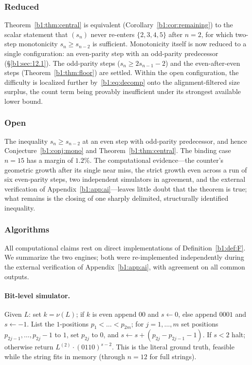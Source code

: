 \documentclass[a4paper]{article}
\theoremstyle{plain}
\theoremstyle{definition}
\theoremstyle{remark}
\begin{document}
\subsubsection*{Reduced} Theorem~\ref{b1:thm:central} is equivalent (Corollary~\ref{b1:cor:remaining}) to the scalar statement that $(s_n)$ never re-enters $\{2,3,4,5\}$ after $n=2$, for which two-step monotonicity $s_n\ge s_{n-2}$ is sufficient. Monotonicity itself is now reduced to a single configuration: an even-parity step with an odd-parity predecessor (\S\ref{b1:sec:12.1}). The odd-parity steps ($s_n\ge 2s_{n-1}-2$) and the even-after-even steps (Theorem~\ref{b1:thm:floor}) are settled. Within the open configuration, the difficulty is localized further by~\eqref{b1:eq:decomp} onto the alignment-filtered size surplus, the count term being provably insufficient under its strongest available lower bound.

\subsubsection*{Open} The inequality $s_n\ge s_{n-2}$ at an even step with odd-parity predecessor, and hence Conjecture~\ref{b1:conj:mono} and Theorem~\ref{b1:thm:central}. The binding case $n=15$ has a margin of $1.2\%$. The computational evidence---the counter's geometric growth after its single near miss, the strict growth even across a run of six even-parity steps, two independent simulators in agreement, and the external verification of Appendix~\ref{b1:app:ai}---leaves little doubt that the theorem is true; what remains is the closing of one sharply delimited, structurally identified inequality.

\subsubsection{Algorithms}\label{b1:app:alg}
All computational claims rest on direct implementations of Definition~\ref{b1:def:F}. We summarize the two engines; both were re-implemented independently during the external verification of Appendix~\ref{b1:app:ai}, with agreement on all common outputs.

\paragraph{Bit-level simulator.} Given $L$: set $k=\nu(L)$; if $k$ is even append $00$ and $s\leftarrow 0$, else append $0001$ and $s\leftarrow -1$. List the $1$-positions $p_1<\dots<p_{2m}$; for $j=1,\dots,m$ set positions $p_{2j-1},\dots,p_{2j}-1$ to $1$, set $p_{2j}$ to $0$, and $s\leftarrow s+(p_{2j}-p_{2j-1}-1)$. If $s<2$ halt; otherwise return $L^{(2)}\cdot(0110)^{s-2}$. This is the literal ground truth, feasible while the string fits in memory (through $n=12$ for full strings).
\end{document}
